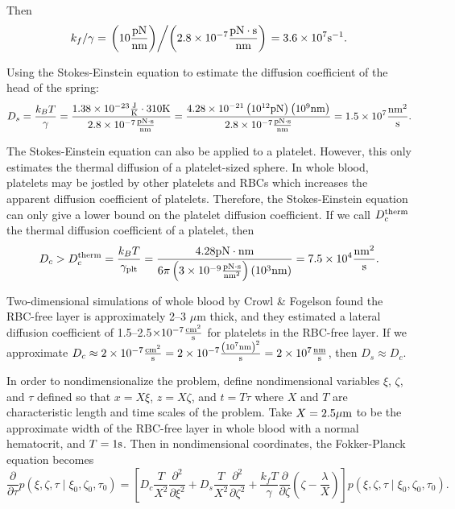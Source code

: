 \documentclass{article}
\newcommand{\tn}{\textnormal}
\newcommand{\Pder}[2]{\frac{\partial #1}{\partial #2}}
\begin{document}
Then
\begin{equation}
  k_f/\gamma = \left.\left(10 \frac{\tn{pN}}{\tn{nm}} \right) \middle/
    \left(2.8 \times 10^{-7}
      \frac{\tn{pN}\cdot\tn{s}}{\tn{nm}}\right)\right. = 3.6 \times
  10^7 \tn{s}^{-1}.
\end{equation}

Using the Stokes-Einstein equation to estimate the diffusion
coefficient of the head of the spring:
\begin{equation}
  D_s = \frac{k_B T}{\gamma} = \frac{1.38 \times 10^{-23}
    \frac{\tn{J}}{\tn{K}} \cdot 310 \tn{K}}{2.8 \times 10^{-7}
    \frac{\tn{pN}\cdot\tn{s}}{\tn{nm}}} = \frac{4.28 \times 10^{-21}
    \left(10^{12} \tn{pN}\right) \left(10^9 \tn{nm}\right)}{2.8 \times
    10^{-7} \frac{\tn{pN}\cdot\tn{s}}{\tn{nm}}} = 1.5 \times 10^7 \frac{\tn{nm}^2}{\tn{s}}.
\end{equation}

The Stokes-Einstein equation can also be applied to a
platelet. However, this only estimates the thermal diffusion of a
platelet-sized sphere. In whole blood, platelets may be jostled by
other platelets and RBCs which increases the apparent diffusion
coefficient of platelets. Therefore, the Stokes-Einstein equation can
only give a lower bound on the platelet diffusion coefficient. If we
call $D_c^\tn{therm}$ the thermal diffusion coefficient of a platelet,
then
\begin{equation}
  D_c > D_c^\tn{therm} = \frac{k_B T}{\gamma_\tn{plt}} = \frac{4.28
    \tn{pN}\cdot\tn{nm}}{6\pi \left(3 \times 10^{-9}
      \frac{\tn{pN}\cdot\tn{s}}{\tn{nm}^2} \right) \left(10^3
      \tn{nm}\right)} = 7.5 \times 10^4 \frac{\tn{nm}^2}{\tn{s}}.
\end{equation}

Two-dimensional simulations of whole blood by Crowl \& Fogelson
\cite{Crowl2011} found the RBC-free layer is approximately 2--3 $\mu$m
thick, and they estimated a lateral diffusion coefficient of
1.5--2.5$\times 10^{-7} \frac{\tn{cm}^2}{\tn{s}}$ for platelets in the
RBC-free layer. If we approximate $D_c \approx 2 \times 10^{-7}
\frac{\tn{cm}^2}{\tn{s}} = 2 \times 10^{-7} \frac{\left(10^7
    \tn{nm}\right)^2}{\tn{s}} = 2 \times 10^7 \frac{\tn{nm}}{\tn{s}}$,
then $D_s \approx D_c$. 

In order to nondimensionalize the problem, define nondimensional
variables $\xi$, $\zeta$, and $\tau$ defined so that $x = X \xi$, $z =
X \zeta$, and $t = T \tau$ where $X$ and $T$ are characteristic length
and time scales of the problem. Take $X = 2.5 \mu\tn{m}$ to be the
approximate width of the RBC-free layer in whole blood with a normal
hematocrit, and $T = 1 \tn{s}$. Then in nondimensional coordinates,
the Fokker-Planck equation becomes
\begin{equation}
  \label{eq:nd-fp}
  \Pder{}{\tau} p(\xi, \zeta, \tau \mid \xi_0, \zeta_0, \tau_0) =
  \left[D_c \frac{T}{X^2} \frac{\partial^2}{\partial \xi^2} + D_s
    \frac{T}{X^2} \frac{\partial^2}{\partial \zeta^2} + \frac{k_f
      T}{\gamma} \Pder{}{\zeta} \left(\zeta - \frac{\lambda}{X}\right)
  \right] p(\xi, \zeta, \tau \mid \xi_0, \zeta_0, \tau_0).
\end{equation}
\end{document}
